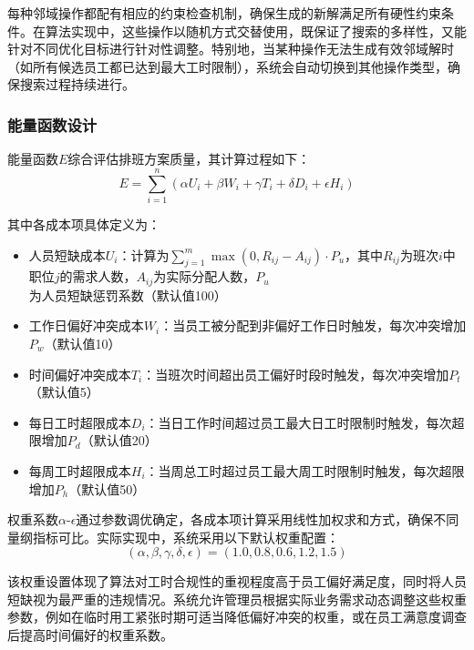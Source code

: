 \documentclass{ctexart}
\begin{document}
每种邻域操作都配有相应的约束检查机制，确保生成的新解满足所有硬性约束条件。在算法实现中，这些操作以随机方式交替使用，既保证了搜索的多样性，又能针对不同优化目标进行针对性调整。特别地，当某种操作无法生成有效邻域解时（如所有候选员工都已达到最大工时限制），系统会自动切换到其他操作类型，确保搜索过程持续进行。

\subsubsection{能量函数设计}
能量函数$E$综合评估排班方案质量，其计算过程如下：
\begin{equation}
E = \sum_{i=1}^{n} \left( \alpha U_i + \beta W_i + \gamma T_i + \delta D_i + \epsilon H_i \right)
\end{equation}

其中各成本项具体定义为：
\begin{itemize}
    \item 人员短缺成本$U_i$：计算为$\sum_{j=1}^{m} \max(0, R_{ij} - A_{ij}) \cdot P_u$，其中$R_{ij}$为班次$i$中职位$j$的需求人数，$A_{ij}$为实际分配人数，$P_u$为人员短缺惩罚系数（默认值100）
    
    \item 工作日偏好冲突成本$W_i$：当员工被分配到非偏好工作日时触发，每次冲突增加$P_w$（默认值10）
    
    \item 时间偏好冲突成本$T_i$：当班次时间超出员工偏好时段时触发，每次冲突增加$P_t$（默认值5）
    
    \item 每日工时超限成本$D_i$：当日工作时间超过员工最大日工时限制时触发，每次超限增加$P_d$（默认值20）
    
    \item 每周工时超限成本$H_i$：当周总工时超过员工最大周工时限制时触发，每次超限增加$P_h$（默认值50）
\end{itemize}

权重系数$\alpha$-$\epsilon$通过参数调优确定，各成本项计算采用线性加权求和方式，确保不同量纲指标可比。实际实现中，系统采用以下默认权重配置：
\begin{equation}
(\alpha, \beta, \gamma, \delta, \epsilon) = (1.0, 0.8, 0.6, 1.2, 1.5)
\end{equation}

该权重设置体现了算法对工时合规性的重视程度高于员工偏好满足度，同时将人员短缺视为最严重的违规情况。系统允许管理员根据实际业务需求动态调整这些权重参数，例如在临时用工紧张时期可适当降低偏好冲突的权重，或在员工满意度调查后提高时间偏好的权重系数。
\end{document}
